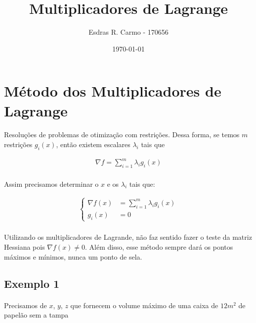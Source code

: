 \documentclass{article}
\author{Esdras R. Carmo - 170656}
\title{Multiplicadores de Lagrange}
\date{\today}
\begin{document}
    \maketitle
    
    \section{Método dos Multiplicadores de Lagrange}
        \paragraph{}
        Resoluções de problemas de otimização com restrições. Dessa forma, se temos $m$ restrições $g_i(x)$, então
        existem escalares $\lambda_i$ tais que

        \begin{align*}
            \nabla f = \sum_{i=1}^m \lambda_i g_i(x)
        \end{align*}

        \paragraph{}
        Assim precisamos determinar o $x$ e os $\lambda_i$ tais que:

        \begin{align*}
            \begin{cases}
                \nabla f(x) &= \sum_{i=1}^m \lambda_i g_i(x)\\
                g_i(x) &= 0
            \end{cases}
        \end{align*}

        \paragraph{}
        Utilizando os multiplicadores de Lagrande, não faz sentido fazer o teste da matriz Hessiana pois $\nabla f(x) \neq 0$. Além disso,
        esse método sempre dará os pontos máximos e mínimos, nunca um ponto de sela.


        \subsection{Exemplo 1}
            \paragraph{}
            Precisamos de $x$, $y$, $z$ que fornecem o volume máximo de uma caixa de $12m^2$ de papelão sem
            a tampa
\end{document}
